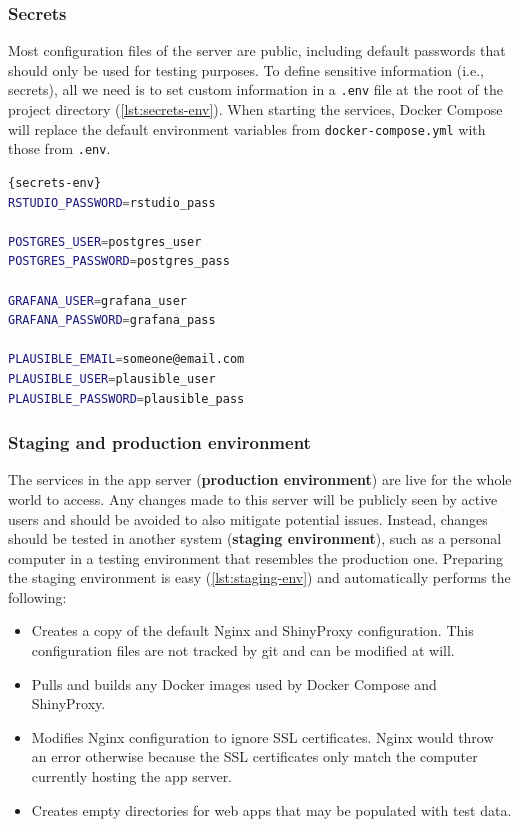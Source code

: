
\subsubsection{Secrets}

Most configuration files of the server are public, including default passwords that should only be used for testing purposes. To define sensitive information (i.e., secrets), all we need is to set custom information in a \texttt{.env} file at the root of the project directory (\autoref{lst:secrets-env}). When starting the services, Docker Compose will replace the default environment variables from \texttt{docker-compose.yml} with those from \texttt{.env}.

\begin{lstlisting}[caption=Template of a \texttt{.env} file that defines sensitive data.,language=bash,label={lst:secrets-env}]{secrets-env}
RSTUDIO_PASSWORD=rstudio_pass

POSTGRES_USER=postgres_user
POSTGRES_PASSWORD=postgres_pass

GRAFANA_USER=grafana_user
GRAFANA_PASSWORD=grafana_pass

PLAUSIBLE_EMAIL=someone@email.com
PLAUSIBLE_USER=plausible_user
PLAUSIBLE_PASSWORD=plausible_pass
\end{lstlisting}

\subsubsection{Staging and production environment}

The services in the app server (\textbf{production environment}) are live for the whole world to access. Any changes made to this server will be publicly seen by active users and should be avoided to also mitigate potential issues. Instead, changes should be tested in another system (\textbf{staging environment}), such as a personal computer in a testing environment that resembles the production one. Preparing the staging environment is easy (\autoref{lst:staging-env}) and automatically performs the following:

\begin{itemize}
	\item Creates a copy of the default Nginx and ShinyProxy configuration. This configuration files are not tracked by git and can be modified at will.
	\item Pulls and builds any Docker images used by Docker Compose and ShinyProxy.
	\item Modifies Nginx configuration to ignore SSL certificates. Nginx would throw an error otherwise because the SSL certificates only match the computer currently hosting the app server.
	\item Creates empty directories for web apps that may be populated with test data.
\end{itemize}

